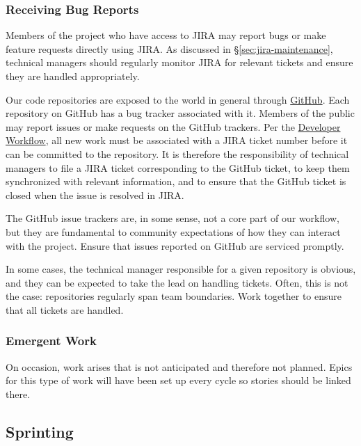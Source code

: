 \subsubsection{Receiving Bug Reports}
\label{receiving-bug-reports}

Members of the project who have access to \gls{JIRA} may report bugs or make feature requests directly using \gls{JIRA}.
As discussed in \S\ref{sec:jira-maintenance}, technical managers should regularly monitor \gls{JIRA} for relevant tickets and ensure they are handled appropriately.

Our code repositories are exposed to the world in general through \href{https://github.com/lsst/}{GitHub}.
Each repository on GitHub has a bug tracker associated with it.
Members of the public may report issues or make requests on the GitHub trackers.
Per the \href{https://developer.lsst.io/processes/workflow.html}{Developer Workflow}, all new work must be associated with a \gls{JIRA} ticket number before it can be committed to the repository.
It is therefore the responsibility of technical managers to file a \gls{JIRA} ticket corresponding to the GitHub ticket, to keep them synchronized with relevant information, and to ensure that the GitHub ticket is closed when the issue is resolved in \gls{JIRA}.

The GitHub issue trackers are, in some sense, not a core part of our
workflow, but they are fundamental to community expectations of how they
can interact with the project. Ensure that issues reported on GitHub are
serviced promptly.

In some cases, the technical manager responsible for a given repository
is obvious, and they can be expected to take the lead on handling
tickets. Often, this is not the case: repositories regularly span team
boundaries. Work together to ensure that all tickets are handled.

\subsubsection{Emergent Work}
\label{emergent-work}

On occasion, work arises that is not anticipated and therefore not planned.  Epics for this type of work will have been set up every cycle so stories should be linked there.


\subsection{Sprinting}
\label{sec:sprinting}

